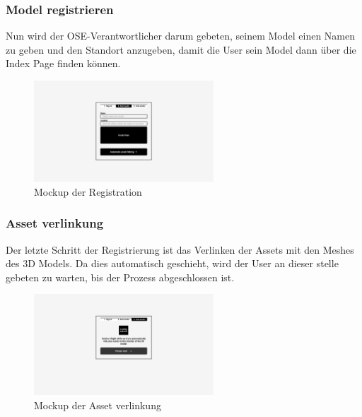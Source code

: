 \subsubsection{Model registrieren}
Nun wird der OSE-Verantwortlicher darum gebeten, seinem Model einen Namen zu geben und den Standort anzugeben, damit die User sein Model dann über die Index Page finden können.
\begin{figure}[H]
  \centering
  \includegraphics[angle=270,width=0.6\textwidth]{./mockups/register/stage_2.pdf}
  \caption[{Mockup der Registration}]{Mockup der Registration}
  \label{fig:mck-stage_2}
\end{figure}
\pagebreak
\subsubsection{Asset verlinkung}
Der letzte Schritt der Registrierung ist das Verlinken der Assets mit den Meshes des 3D Models. Da dies automatisch geschieht, wird der User an dieser stelle gebeten zu warten, bis der Prozess abgeschlossen ist.
\begin{figure}[H]
  \centering
  \includegraphics[angle=270,width=0.6\textwidth]{./mockups/register/stage_3.pdf}
  \caption[{Mockup der Asset verlinkung}]{Mockup der Asset verlinkung}
  \label{fig:mck-stage_3}
\end{figure}
\pagebreak
